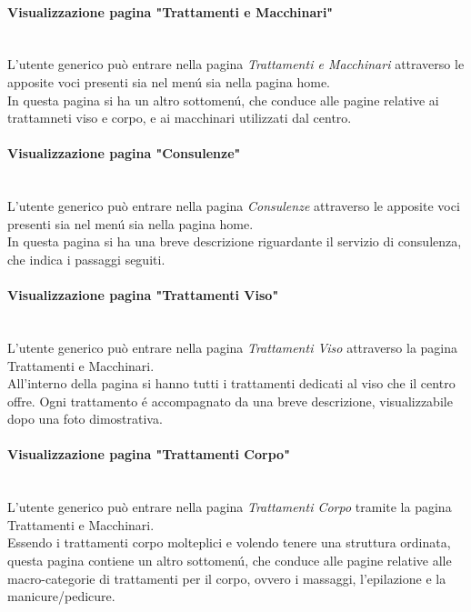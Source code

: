 \documentclass[]{article}
\begin{document}
\paragraph{Visualizzazione pagina "Trattamenti e Macchinari"}\mbox{}\\
L'utente generico può entrare nella pagina \textit{Trattamenti e Macchinari} attraverso le apposite voci presenti sia nel menú sia nella pagina home.\\
In questa pagina si ha un altro sottomenú, che conduce alle pagine relative ai trattamneti viso e corpo, e ai macchinari utilizzati dal centro.\\

\paragraph{Visualizzazione pagina "Consulenze"}\mbox{}\\
L'utente generico può entrare nella pagina \textit{Consulenze} attraverso le apposite voci presenti sia nel menú sia nella pagina home.\\
In questa pagina si ha una breve descrizione riguardante il servizio di consulenza, che indica i passaggi seguiti.\\

\paragraph{Visualizzazione pagina "Trattamenti Viso"}\mbox{}\\
L'utente generico può entrare nella pagina \textit{Trattamenti Viso} attraverso la pagina Trattamenti e Macchinari.\\
All'interno della pagina si hanno tutti i trattamenti dedicati al viso che il centro offre. Ogni trattamento é accompagnato da una breve descrizione, visualizzabile dopo una foto dimostrativa.\\

\paragraph{Visualizzazione pagina "Trattamenti Corpo"}\mbox{}\\
L'utente generico può entrare nella pagina \textit{Trattamenti Corpo} tramite la pagina Trattamenti e Macchinari.\\
Essendo i trattamenti corpo molteplici e volendo tenere una struttura ordinata, questa pagina contiene un altro sottomenú, che conduce alle pagine relative alle macro-categorie di trattamenti per il corpo, ovvero i massaggi, l'epilazione e la manicure/pedicure.\\
\end{document}
